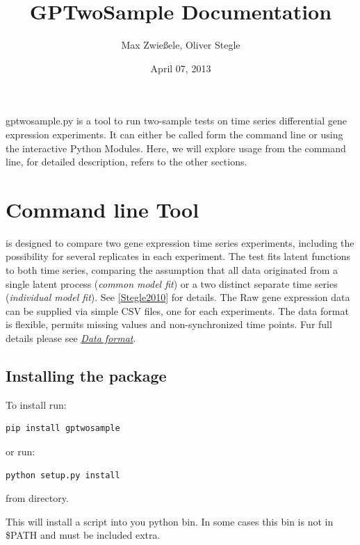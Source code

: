 \documentclass[letterpaper,10pt,english]{sphinxmanual}
\title{GPTwoSample Documentation}
\date{April 07, 2013}
\author{Max Zwießele, Oliver Stegle}
\begin{document}
\maketitle
\tableofcontents
{}\label{index::doc}


gptwosample.py is a tool to run two-sample tests on time series
differential gene expression experiments. It can either be called form
the command line or using the interactive Python Modules. Here, we
will explore usage from the command line, for detailed description,
refers to the other sections.


\chapter{Command line Tool}
\label{index:command-line-tool}\label{index:welcome-to-gptwosample}
 is designed to compare two gene expression time series
experiments, including the possibility for several replicates in each
experiment. The test fits latent functions to both time series,
comparing the assumption that all data originated from a single latent
process (\emph{common model fit}) or a two distinct separate time series
(\emph{individual model fit}). See {\hyperref[index:stegle2010]{{[}Stegle2010{]}}} for details. The Raw gene expression data can
be supplied via simple CSV files, one for each experiments. The data
format is flexible, permits missing values and non-synchronized time
points. Fur full details please see {\hyperref[usage:dataformat]{\emph{Data format}}}.


\section{Installing the package}
\label{index:installing-the-package}\label{index:install}
To install  run:

\begin{Verbatim}[commandchars=\\\{\}]
pip install gptwosample
\end{Verbatim}

or run:

\begin{Verbatim}[commandchars=\\\{\}]
python setup.py install
\end{Verbatim}

from  directory.

This will install a script  into you python bin. In
some cases this bin is not in \$PATH and must be included extra.
\end{document}

